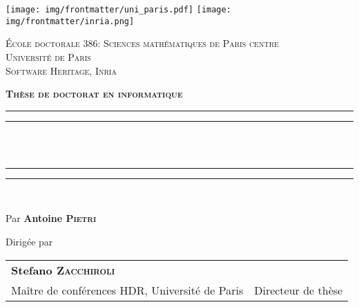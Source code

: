 \begin{titlingpage*}
\begin{SingleSpace}
\calccentering{\unitlength}

\texttt{[image: img/frontmatter/uni\_paris.pdf]}  \hfill
\texttt{[image: img/frontmatter/inria.png]} \hfill
{}

\begin{center}
\begin{otherlanguage}{french}

    \textsc{École doctorale 386: Sciences mathématiques de Paris centre}\\
\vspace{2mm}
\textsc{Université de Paris}\\
\vspace{2mm}
\textsc{Software Heritage, Inria}\\

\vspace{4mm}

\textsc{\Large \textbf{Thèse de doctorat en informatique}}\\

\vspace*{2mm}

\rule[0.5ex]{\linewidth}{2pt}\vspace*{-\baselineskip}\vspace*{3.2pt}
\rule[0.5ex]{\linewidth}{1pt}\\[\baselineskip]
\vspace{-0.35cm}
{\huge \thetitle{}}\\
\rule[0.5ex]{\linewidth}{1pt}\vspace*{-\baselineskip}\vspace*{3.4pt}
\rule[0.5ex]{\linewidth}{2pt}\\

\vspace{2mm}

{\LARGE Par } {\LARGE\textbf{Antoine \textsc{Pietri}}}\\

\vspace{5mm}

{\large Dirigée par }\\

\vspace{3mm}

\begin{tabular}{lr}
  \textbf{Stefano {\scshape Zacchiroli}} & \\
  Maître de conférences HDR, Université de Paris \hspace{25mm} &
  Directeur de thèse \\
\end{tabular}


\end{otherlanguage}
\end{center}
\end{SingleSpace}
\end{titlingpage*}
